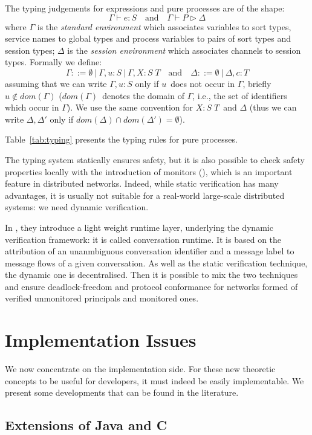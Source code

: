 \documentclass{article}
\newcommand{\ptilde}[1]{{\ensuremath{#1}}}
\newcommand{\uu}{\ensuremath{u}}
\newcommand{\PP}{\ensuremath{P}}
\newcommand{\cc}{\ensuremath{c}}
\newcommand{\e}{\ensuremath{e}}
\newcommand{\X}{\ensuremath{X}}
\newcommand{\atw}[1]{\ensuremath{\ptilde{#1}}}
\newcommand{\sep}{\ensuremath{~\mathbf{|}~ }}
\newcommand{\Ga}{\ensuremath{\Gamma}}
\newcommand{\D}{\ensuremath{\Delta}}
\newcommand{\T}{\ensuremath{T}}
\newcommand{\TT}{\atw{\T}}
\newcommand{\SST}{\atw{S}}
\newcommand{\der}[3]{\ensuremath{#1\vdash#2\triangleright#3}}
\newcommand{\dom}[1]{\ensuremath{dom( #1)}}
\newcommand{\Xtype}{\ensuremath{\X : \SST\;\TT}}
\begin{document}
The typing judgements for expressions and pure processes are of the shape:
\[
\Gamma\vdash \e :S\quad \text{and}\quad \der \Ga {\PP}\D
\]
where $\Ga$ is the {\em standard environment}
which associates variables to sort types, service names to global
types and process variables to pairs of sort types and session 
types; $\D$ is the {\em session environment} which associates
channels to session types.
Formally we define:
\[
\Ga::=\emptyset\sep\Ga,\uu:S\sep\Ga,
\Xtype\quad \text{and} \quad \D::=\emptyset\sep\D,\cc:T
\]
assuming that we can write $\Ga,\uu:S$ only if \uu\ does not occur
in \Ga, briefly $\uu\not\in\dom\Ga$ (\dom\Ga\ denotes the domain of
\Ga, i.e., the set of identifiers which occur in \Ga). We use the
same convention for \Xtype\ and \D{} (thus we can write $\D, \D'$ only if
$\dom\D\cap\dom{\D'}=\emptyset$).

Table~\ref{tab:typing} presents the typing rules for
pure processes.


The typing system statically ensures safety, but it is also possible to check safety properties locally with the introduction of monitors (\cite{bocchisafety}), which is an important feature in distributed networks. Indeed, while static verification has many advantages, it is usually not suitable for a real-world large-scale distributed systems: we need dynamic verification.

In \cite{bocchisafety}, they introduce a light weight runtime layer, underlying the dynamic verification framework: it is called conversation runtime. It is based on the attribution of an unanmbiguous conversation identifier and a message label to message flows of a given conversation. As well as the static verification technique, the dynamic one is decentralised. Then it is possible to mix the two techniques and ensure deadlock-freedom and protocol conformance for networks formed of verified unmonitored principals and monitored ones.

\section{Implementation Issues}

We now concentrate on the implementation side. For these new theoretic concepts to be useful for developers, it must indeed be easily implementable. We present some developments that can be found in the literature.

\subsection{Extensions of Java and C}
\end{document}
